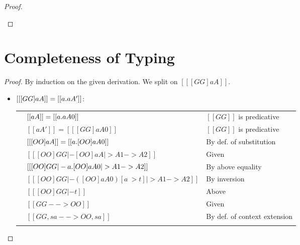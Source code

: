 \begin{proof}
\begin{itemize}
\begin{itemize}
    \end{itemize}
  \end{itemize}
\end{proof}


\newpage

\section{Completeness of Typing}


\matchcomplete*
\begin{proof}
 By induction on the given derivation. We split on $[[ [GG]aA ]]   $.

 \begin{itemize}
 \item $[[  [GG]aA  ]] = [[ \/a. aA'   ]]$:
    \begin{longtable}[l]{ll|l}
      &$[[aA]] = [[ \/a . aA0]]   $& $[[GG]]$ is predicative \\
      & $[[aA']] = [[ [GG]aA0  ]]$ & $[[GG]]$ is predicative \\
      & $[[ [OO]aA   ]]  =  [[ \/a. [OO]aA0  ]]    $ & By def. of substitution \\
      & $[[  [OO]GG |- [OO]aA |> A1 -> A2  ]]$ & Given \\
      & $[[  [OO]GG |- \/a. [OO]aA0 |> A1 -> A2  ]]$ & By above equality \\
      & $[[  [OO]GG |- ([OO]aA0) [a ~> t]  |> A1 -> A2  ]]$ & By inversion \\
      & $[[  [OO]GG |- t   ]]$ & Above \\
      & $[[ GG --> OO   ]]$ & Given \\
      & $[[ GG, sa --> OO, sa   ]]$ & By def. of context extension \\ \\


\end{longtable}
\end{itemize}
\end{proof}
